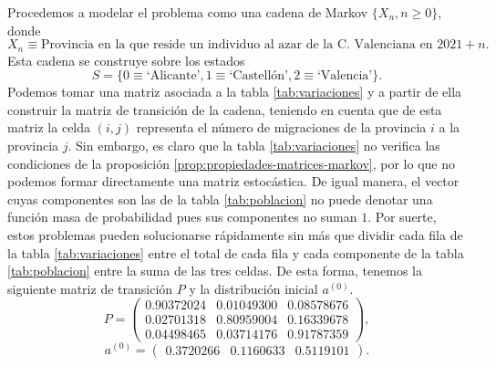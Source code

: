 \begin{ejemplo}
        Procedemos a modelar el problema como una cadena de Markov $\{X_n,n\geq0\}$, donde 
        $$X_n \equiv \text{Provincia en la que reside un individuo al azar de la C. Valenciana en }2021+n.$$ 
        Esta cadena se construye sobre los estados 
        $$
        S=\{0\equiv\text{`Alicante'}, 1\equiv\text{`Castellón'},2\equiv\text{`Valencia'}\}.
        $$
        Podemos tomar una matriz asociada a la tabla \ref{tab:variaciones} y a partir de ella construir la matriz de transición de la cadena, teniendo en cuenta que de esta matriz la celda $(i,j)$ representa el número de migraciones de la provincia $i$ a la provincia $j$. Sin embargo, es claro que la tabla \ref{tab:variaciones} no verifica las condiciones de la proposición \ref{prop:propiedades-matrices-markov}, por lo que no podemos formar directamente una matriz estocástica. De igual manera, el vector cuyas componentes son las de la tabla \ref{tab:poblacion} no puede denotar una función masa de probabilidad pues sus componentes no suman $1$. Por suerte, estos problemas pueden solucionarse rápidamente sin más que dividir cada fila de la tabla \ref{tab:variaciones} entre el total de cada fila y cada componente de la tabla \ref{tab:poblacion} entre la suma de las tres celdas. De esta forma, tenemos la siguiente matriz de transición $P$ y la distribución inicial $a^{(0)}$.
        \begin{equation*}
            \label{eq:ejemplo-migraciones-matriz}
            P = \begin{pmatrix}
                0.90372024 & 0.01049300 & 0.08578676 \\
                0.02701318 & 0.80959004 & 0.16339678 \\
                0.04498465 & 0.03714176 & 0.91787359
            \end{pmatrix}, 
        \end{equation*}
        \begin{equation*}
            a^{(0)} = \begin{pmatrix}
                0.3720266 &
                0.1160633 &
                0.5119101
            \end{pmatrix}.
        \end{equation*}
         

\end{ejemplo}
